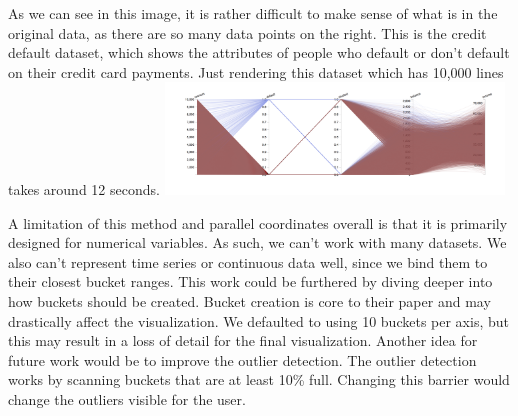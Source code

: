 \documentclass[	DIV=calc,%
			paper=a4,%
			fontsize=11pt,%
			twocolumn]{scrartcl}					%
\begin{document}
As we can see in this image, it is rather difficult to make sense of what is in the original data, as
there are so many data points on the right. This is the credit default dataset, which shows
the attributes of people who default or don't default on their credit card payments. Just rendering
this dataset which has 10,000 lines takes around 12 seconds. 
\includegraphics[width=9cm]{credit-default-parcoord.png}

A limitation of this method and parallel coordinates overall is that it is primarily designed for numerical variables. As such, we can't work with many datasets. We also can't represent time series or continuous data well, since we bind them to their closest bucket ranges. 
This work could be furthered by diving deeper into how buckets should be created. Bucket creation is core to their paper and may drastically affect the visualization. We defaulted to using 10 buckets per axis, but this may result in a loss of detail for the final visualization. 
Another idea for future work would be to improve the outlier detection. The outlier detection works by scanning buckets that are at least 10\% full. Changing this barrier would change the outliers visible for the user. 




\end{document}
